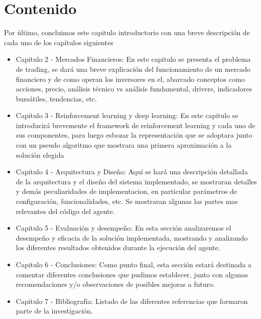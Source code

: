 \section{Contenido}
Por último, concluimos este capitulo introductorio con una breve descripción de cada uno de los capítulos siguientes

\begin{itemize} %
	\item Capitulo 2 - Mercados Financieros: En este capitulo se presenta el problema de trading, se dará una breve explicación del funcionamiento de un mercado financiero y de como operan los inversores en el, abarcado conceptos como acciones, precio, análisis técnico vs análisis fundamental, drivers, indicadores bursátiles, tendencias, etc.
	\item Capitulo 3 - Reinforcement learning y deep learning: En este capitulo se introducirá brevemente el framework de reinforcement learning y cada uno de sus componentes, para luego esbozar la representación que se adoptara junto con un pseudo algoritmo que mostrara una primera aproximación a la solución elegida
	\item Capitulo 4 - Arquitectura y Diseño: Aquí se hará una descripción detallada de la arquitectura y el diseño del sistema implementado, se mostraran detalles y demás peculiaridades de implementacion, en particular parámetros de configuración, funcionalidades, etc. Se mostraran algunas las partes mas relevantes del código del agente.
	\item Capitulo 5 - Evaluación y desempeño: En esta sección analizaremos el desempeño y eficacia de la solución implementada, mostrando y analizando los diferentes resultados obtenidos durante la ejecución del agente.
	\item Capitulo 6 - Conclusiones: Como punto final, esta sección estará destinada a comentar diferentes conclusiones que pudimos establecer, junto con algunas recomendaciones y/o observaciones de posibles mejoras a futuro.
	\item Capitulo 7 - Bibliografía: Listado de las diferentes referencias que formaron parte de la investigación.
\end{itemize}